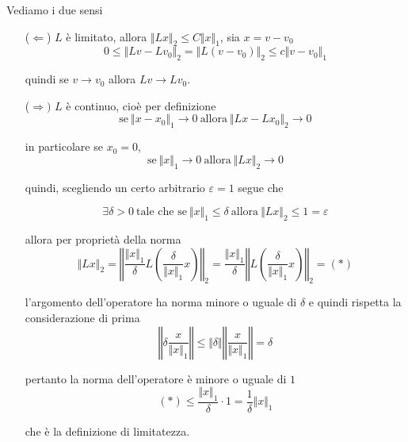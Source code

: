 \documentclass[10pt,a4paper,twoside,openright]{book}
\begin{document}
\begin{dimostrazione}
Vediamo i due sensi
\begin{itemize}
	\item[($\Leftarrow $)] $L$ è limitato, allora $\Vert Lx\Vert _{2} \leqslant C\Vert x\Vert _{1}$, sia $x=v-v_{0}$
	\begin{equation*}
		0\leqslant \Vert Lv-Lv_{0}\Vert _{2} =\Vert L(v-v_{0})\Vert _{2} \leqslant c\Vert v-v_{0}\Vert _{1}
	\end{equation*}

	quindi se $v\rightarrow v_{0}$ allora $Lv\rightarrow Lv_{0}$.

	\item[($\Rightarrow)$] $L$ è continuo, cioè per definizione
	\begin{equation*}
		\text{se} \ \Vert x-x_{0}\Vert _{1}\rightarrow 0\ \text{allora} \ \Vert Lx-Lx_{0}\Vert _{2}\rightarrow 0
	\end{equation*}

	in particolare se $x_{0} =0$,
	\begin{equation*}
		\text{se} \ \Vert x\Vert _{1}\rightarrow 0\ \text{allora} \ \Vert Lx\Vert _{2}\rightarrow 0
	\end{equation*}

	quindi, scegliendo un certo arbitrario $\varepsilon =1$ segue che

	\begin{equation*}
		\exists \delta  >0\ \text{tale che se} \ \Vert x\Vert _{1} \leqslant \delta \ \text{allora} \ \Vert Lx\Vert _{2} \leqslant 1=\varepsilon 
	\end{equation*}

	allora per proprietà della norma
	\begin{equation*}
		\Vert Lx\Vert _{2} =\left\Vert \frac{\Vert x\Vert _{1}}{\delta } L\left(\frac{\delta }{\Vert x\Vert _{1}} x\right)\right\Vert _{2} =\frac{\Vert x\Vert _{1}}{\delta }\left\Vert L\left(\frac{\delta }{\Vert x\Vert _{1}} x\right)\right\Vert _{2} =(*)
	\end{equation*}

	l'argomento dell'operatore ha norma minore o uguale di $\delta $ e quindi rispetta la considerazione di prima
	\begin{equation*}
		\left\Vert \delta \frac{x}{\Vert x\Vert _{1}}\right\Vert \leqslant \Vert \delta \Vert \left\Vert \frac{x}{\Vert x\Vert _{1}}\right\Vert =\delta 
	\end{equation*}

	pertanto la norma dell'operatore è minore o uguale di $1$
	\begin{equation*}
		(*) \leqslant \frac{\Vert x\Vert _{1}}{\delta } \cdotp 1=\frac{1}{\delta }\Vert x\Vert _{1}
	\end{equation*}

	che è la definizione di limitatezza.
\end{itemize}


\end{dimostrazione}
\end{document}
